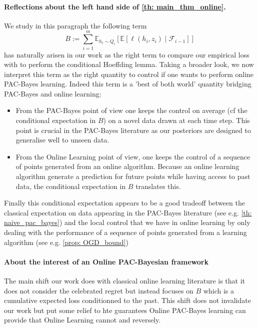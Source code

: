 \begin{noaddcontents}
 \paragraph{Reflections about the left hand side of \cref{th: main_thm_online}.}

 We study in this paragraph the following term
  $$B:=\sum_{i=1}^m \mathbb{E}_{h_i\sim Q_{i}}\left[ \mathbb{E}[\ell(h_i,z_i) \mid \mathcal{F}_{i-1}]    \right]$$ has naturally arisen in our work as the right term to compare our empirical loss with to perform the conditional Hoeffding lemma.
 Taking a broader look, we now interpret this term as the right quantity to control if one wants to perform online PAC-Bayes learning. Indeed this term is a 'best of both world' quantity bridging PAC-Bayes and online learning:

 \begin{itemize}
   \item From the PAC-Bayes point of view one keeps the control on average (cf the conditional expectation in $B$) on a novel data drawn at each time step. This point is crucial in the PAC-Bayes literature as our posteriors are designed to generalise well to unseen data.
   \item From the Online Learning point of view, one keeps the control of a sequence of points generated from an online algorithm. Because an online learning algorithm generate a prediction for future points while having access to past data, the conditional expectation in $B$ translates this.
 \end{itemize}

Finally this conditional expectation appears to be a good tradeoff between the classical expectation on data appearing in the PAC-Bayes literature (see e.g. \cref{th: naive_pac_bayes}) and the local control that we have in online learning by only dealing with the performance of a sequence of points generated from a learning algorithm (see e.g. \cref{prop: OGD_bound})


\paragraph{About the interest of an Online PAC-Bayesian framework}
The main shift our work does with classical online learning literature is that it does not consider the celebrated regret but instead focuses on $B$ which is a cumulative expected loss conditionned to the past. This shift does not invalidate our work but put some relief to hte guarantees Online PAC-Bayes learning can provide that Online Learning cannot and reversely.


\end{noaddcontents}
